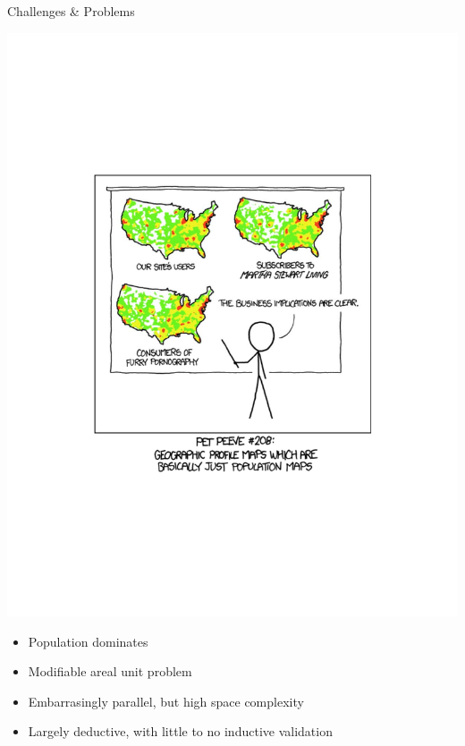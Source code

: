 \documentclass{beamer}
\begin{document}
\begin{frame}{Challenges \& Problems}
  \begin{center}
    \includegraphics[width=0.4\textheight]{heatmap}
  \end{center}
  \begin{itemize}
  \item Population dominates
  \item Modifiable areal unit problem
  \item Embarrasingly parallel, but high space complexity
  \item Largely deductive, with little to no inductive validation
  \end{itemize}
\end{frame}
\end{document}
